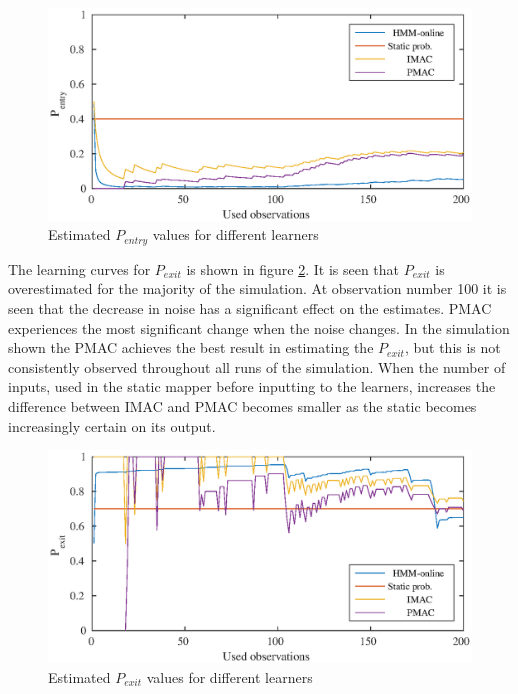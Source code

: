 \begin{figure}[H]
	\centering
	\includegraphics[scale=1]{chapters/mapping_of_dynamic_areas/figures/pmac_imac_hmm_entry}
	\caption{Estimated \(P_{entry}\) values for different learners}
	\label{fig:markow_learning_pmac_comparison_entry}
\end{figure}

The learning curves for \(P_{exit}\) is shown in figure \ref{fig:markow_learning_pmac_comparison_exit}. 
It is seen that \(P_{exit}\) is overestimated for the majority of the simulation. 
At observation number 100 it is seen that the decrease in noise has a significant effect on the estimates. 
PMAC experiences the most significant change when the noise changes. 
In the simulation shown the PMAC achieves the best result in estimating the \(P_{exit}\), but this is not consistently observed throughout all runs of the simulation. 
When the number of inputs, used in the static mapper before inputting to the learners, increases the difference between IMAC and PMAC becomes smaller as the static becomes increasingly certain on its output. 

\begin{figure}[H]
	\centering
	\includegraphics[scale=1]{chapters/mapping_of_dynamic_areas/figures/pmac_imac_hmm_exit}
	\caption{Estimated \(P_{exit}\) values for different learners}
	\label{fig:markow_learning_pmac_comparison_exit}
\end{figure}

